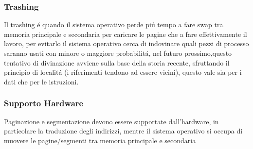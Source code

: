     \subsubsection{Trashing}
    Il trashing é quando il sistema operativo perde piú tempo a fare swap tra memoria principale e secondaria per
    caricare le pagine che a fare effettivamente il lavoro, per evitarlo il sistema operativo cerca di indovinare quali
    pezzi di processo saranno usati con minore o maggiore probabilitá, nel futuro prossimo,questo tentativo di divinazione
    avviene sulla base della storia recente, sfruttando il principio di localitá (i riferimenti tendono ad essere vicini),
    questo vale sia per i dati che per le istruzioni.
    \subsubsection{Supporto Hardware}
    Paginazione e segmentazione devono essere supportate dall'hardware, in particolare la traduzione degli indirizzi,
    mentre il sistema operativo si occupa di muovere le pagine/segmenti tra memoria principale e secondaria
